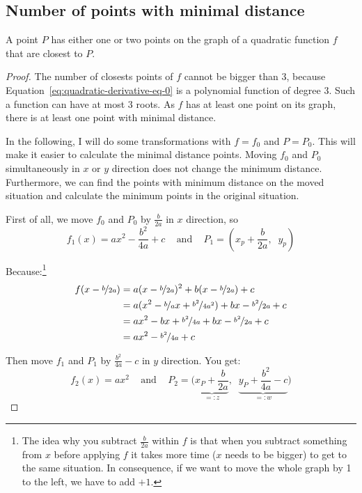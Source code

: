 \subsection{Number of points with minimal distance}
\begin{theorem}
    A point $P$ has either one or two points on the graph of a 
    quadratic function $f$ that are closest to $P$.
\end{theorem}

\begin{proof}
The number of closests points of $f$ cannot be bigger than 3, because
Equation~\ref{eq:quadratic-derivative-eq-0} is a polynomial function
of degree 3. Such a function can have at most 3 roots. As $f$ has
at least one point on its graph, there is at least one point with
minimal distance.

In the following, I will do some transformations with $f = f_0$ and
$P = P_0$. This will make it easier to calculate the minimal distance
points. Moving $f_0$ and $P_0$ simultaneously in $x$ or $y$ direction does 
not change the minimum distance. Furthermore, we can find the 
points with minimum distance on the moved situation and calculate
the minimum points in the original situation.

First of all, we move $f_0$ and $P_0$ by $\frac{b}{2a}$ in $x$ direction, so
\[f_1(x) = ax^2 - \frac{b^2}{4a} + c \;\;\;\text{ and }\;\;\; P_1 = \left (x_p+\frac{b}{2a},\;\; y_p \right )\]

Because:\footnote{The idea why you subtract $\frac{b}{2a}$ within
$f$ is that when you subtract something from $x$ before applying
$f$ it takes more time ($x$ needs to be bigger) to get to the same
situation. In consequence, if we want to move the whole graph by 1 
to the left, we have to add $+1$.}
\begin{align}
    f(x-\nicefrac{b}{2a}) &= a (x-\nicefrac{b}{2a})^2 + b (x-\nicefrac{b}{2a}) + c\\
    &= a (x^2 - \nicefrac{b}{a} x + \nicefrac{b^2}{4a^2}) + bx - \nicefrac{b^2}{2a} + c\\
    &= ax^2 - bx + \nicefrac{b^2}{4a} + bx - \nicefrac{b^2}{2a} + c\\
    &= ax^2 -\nicefrac{b^2}{4a} + c
\end{align}


Then move $f_1$ and $P_1$ by $\frac{b^2}{4a}-c$ in $y$ direction. You get:
\[f_2(x) = ax^2\;\;\;\text{ and }\;\;\; P_2 = \Big (\underbrace{x_P+\frac{b}{2a}}_{=: z},\;\; \underbrace{y_P+\frac{b^2}{4a}-c}_{=: w} \Big )\]


\end{proof}
